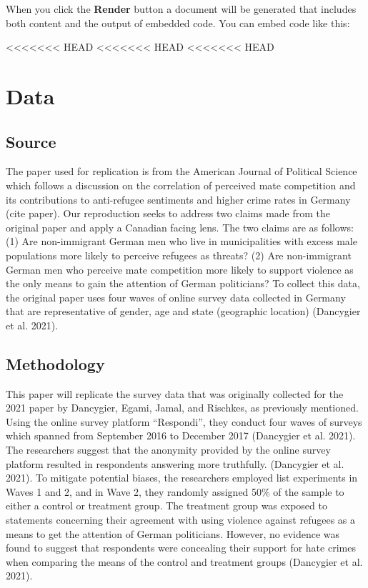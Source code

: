 \documentclass[
]{article}
\begin{document}
When you click the \textbf{Render} button a document will be generated
that includes both content and the output of embedded code. You can
embed code like this:

\textless\textless\textless\textless\textless\textless\textless{} HEAD
\textless\textless\textless\textless\textless\textless\textless{} HEAD
\textless\textless\textless\textless\textless\textless\textless{} HEAD

\hypertarget{data}{%
\section{Data}\label{data}}

\hypertarget{source}{%
\subsection{Source}\label{source}}

The paper used for replication is from the American Journal of Political
Science which follows a discussion on the correlation of perceived mate
competition and its contributions to anti-refugee sentiments and higher
crime rates in Germany (cite paper). Our reproduction seeks to address
two claims made from the original paper and apply a Canadian facing
lens. The two claims are as follows: (1) Are non-immigrant German men
who live in municipalities with excess male populations more likely to
perceive refugees as threats? (2) Are non-immigrant German men who
perceive mate competition more likely to support violence as the only
means to gain the attention of German politicians? To collect this data,
the original paper uses four waves of online survey data collected in
Germany that are representative of gender, age and state (geographic
location) (Dancygier et al. 2021).

\hypertarget{methodology}{%
\subsection{Methodology}\label{methodology}}

This paper will replicate the survey data that was originally collected
for the 2021 paper by Dancygier, Egami, Jamal, and Rischkes, as
previously mentioned. Using the online survey platform ``Respondi'',
they conduct four waves of surveys which spanned from September 2016 to
December 2017 (Dancygier et al. 2021). The researchers suggest that the
anonymity provided by the online survey platform resulted in respondents
answering more truthfully. (Dancygier et al. 2021). To mitigate
potential biases, the researchers employed list experiments in Waves 1
and 2, and in Wave 2, they randomly assigned 50\% of the sample to
either a control or treatment group. The treatment group was exposed to
statements concerning their agreement with using violence against
refugees as a means to get the attention of German politicians. However,
no evidence was found to suggest that respondents were concealing their
support for hate crimes when comparing the means of the control and
treatment groups (Dancygier et al. 2021).
\end{document}

